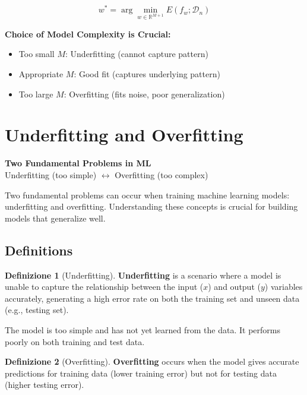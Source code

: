 \documentclass[11pt,a4paper]{article}
\theoremstyle{definition}
\newtheorem{definition}{Definizione}[section]
\theoremstyle{plain}
\theoremstyle{remark}
\begin{document}
\[
w^* = \arg\min_{w \in \mathbb{R}^{M+1}} E(f_w; \mathcal{D}_n)
\]

\begin{center}
\colorbox{cyan!10}{\parbox{0.9\textwidth}{
\textbf{Choice of Model Complexity is Crucial:}
\begin{itemize}
    \item Too small $M$: Underfitting (cannot capture pattern)
    \item Appropriate $M$: Good fit (captures underlying pattern)
    \item Too large $M$: Overfitting (fits noise, poor generalization)
\end{itemize}
}}
\end{center}

\section{Underfitting and Overfitting}

\begin{center}
\colorbox{purple!15}{\parbox{0.9\textwidth}{
\centering
\textbf{Two Fundamental Problems in ML}\\[0.2cm]
Underfitting (too simple) $\leftrightarrow$ Overfitting (too complex)
}}
\end{center}

Two fundamental problems can occur when training machine learning models: underfitting and overfitting. Understanding these concepts is crucial for building models that generalize well.

\subsection{Definitions}

\begin{definition}[Underfitting]
\textbf{Underfitting} is a scenario where a model is unable to capture the relationship between the input ($x$) and output ($y$) variables accurately, generating a high error rate on both the training set and unseen data (e.g., testing set).
\end{definition}

The model is too simple and has not yet learned from the data. It performs poorly on both training and test data.

\begin{definition}[Overfitting]
\textbf{Overfitting} occurs when the model gives accurate predictions for training data (lower training error) but not for testing data (higher testing error).
\end{definition}
\end{document}
